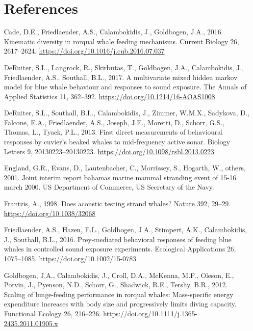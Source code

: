 \documentclass[]{elsarticle} %
\begin{document}
\section*{References}\label{references}

\hypertarget{refs}{}
\hypertarget{ref-cade_kinematic_2016}{}
Cade, D.E., Friedlaender, A.S., Calambokidis, J., Goldbogen, J.A., 2016.
Kinematic diversity in rorqual whale feeding mechanisms. Current Biology
26, 2617--2624. \url{https://doi.org/10.1016/j.cub.2016.07.037}

\hypertarget{ref-deruiter_multivariate_2017}{}
DeRuiter, S.L., Langrock, R., Skirbutas, T., Goldbogen, J.A.,
Calambokidis, J., Friedlaender, A.S., Southall, B.L., 2017. A
multivariate mixed hidden markov model for blue whale behaviour and
responses to sound exposure. The Annals of Applied Statistics 11,
362--392. \url{https://doi.org/10.1214/16-AOAS1008}

\hypertarget{ref-deruiter_first_2013}{}
DeRuiter, S.L., Southall, B.L., Calambokidis, J., Zimmer, W.M.X.,
Sadykova, D., Falcone, E.A., Friedlaender, A.S., Joseph, J.E., Moretti,
D., Schorr, G.S., Thomas, L., Tyack, P.L., 2013. First direct
measurements of behavioural responses by cuvier's beaked whales to
mid-frequency active sonar. Biology Letters 9, 20130223--20130223.
\url{https://doi.org/10.1098/rsbl.2013.0223}

\hypertarget{ref-england_joint_2001}{}
England, G.R., Evans, D., Lautenbacher, C., Morrissey, S., Hogarth, W.,
others, 2001. Joint interim report bahamas marine mammal stranding event
of 15-16 march 2000. US Department of Commerce, US Secretary of the
Navy.

\hypertarget{ref-frantzis_does_1998}{}
Frantzis, A., 1998. Does acoustic testing strand whales? Nature 392,
29--29. \url{https://doi.org/10.1038/32068}

\hypertarget{ref-friedlaender_prey-mediated_2016}{}
Friedlaender, A.S., Hazen, E.L., Goldbogen, J.A., Stimpert, A.K.,
Calambokidis, J., Southall, B.L., 2016. Prey-mediated behavioral
responses of feeding blue whales in controlled sound exposure
experiments. Ecological Applications 26, 1075--1085.
\url{https://doi.org/10.1002/15-0783}

\hypertarget{ref-goldbogen_scaling_2012}{}
Goldbogen, J.A., Calambokidis, J., Croll, D.A., McKenna, M.F., Oleson,
E., Potvin, J., Pyenson, N.D., Schorr, G., Shadwick, R.E., Tershy, B.R.,
2012. Scaling of lunge-feeding performance in rorqual whales:
Mass-specific energy expenditure increases with body size and
progressively limits diving capacity. Functional Ecology 26, 216--226.
\url{https://doi.org/10.1111/j.1365-2435.2011.01905.x}
\end{document}
